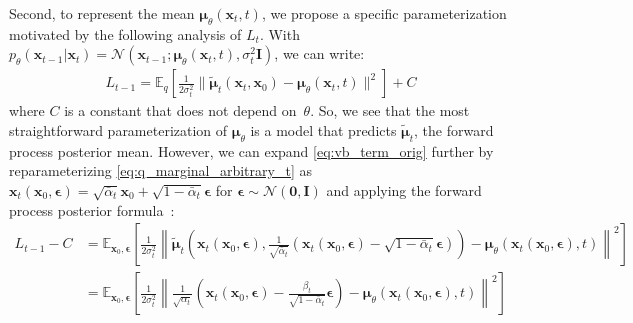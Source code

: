 \documentclass{article}
\newcommand{\E}{\mathbb{E}}
\newcommand{\Eb}[2]{\E_{#1}\!\left[#2\right]}
\newcommand{\bI}{\mathbf{I}}
\newcommand{\bzero}{\mathbf{0}}
\newcommand{\bx}{\mathbf{x}}
\newcommand{\bepsilon}{{\boldsymbol{\epsilon}}}
\newcommand{\bmu}{{\boldsymbol{\mu}}}
\begin{document}
Second, to represent the mean $\bmu_\theta(\bx_t, t)$, we propose a specific parameterization motivated by the following analysis of $L_t$.
With $p_\theta(\bx_{t-1} | \bx_t) = \mathcal{N}(\bx_{t-1}; \bmu_\theta(\bx_t, t), \sigma_t^2\bI)$, we can write:
\begin{align}
  L_{t-1}
   = \Eb{q}{ \frac{1}{2\sigma_t^2} \|\tilde\bmu_t(\bx_t,\bx_0) - \bmu_\theta(\bx_t, t)\|^2 } + C \label{eq:vb_term_orig}
\end{align}
where $C$ is a constant that does not depend on~$\theta$. So, we see that the most straightforward parameterization of $\bmu_\theta$ is a model that predicts $\tilde\bmu_t$, the forward process posterior mean.
However, we can expand \cref{eq:vb_term_orig} further by reparameterizing \cref{eq:q_marginal_arbitrary_t} as $\bx_t(\bx_0, \bepsilon) = \sqrt{\bar\alpha_t}\bx_0 + \sqrt{1-\bar\alpha_t}\bepsilon$ for $\bepsilon \sim \mathcal{N}(\bzero, \bI)$ and applying the forward process posterior formula~:
\begin{align}
  L_{t-1} - C &= \Eb{\bx_0, \bepsilon}{ \frac{1}{2\sigma_t^2} \left\| \tilde\bmu_t\!\left(\bx_t(\bx_0, \bepsilon), \frac{1}{\sqrt{\bar\alpha_t}} (\bx_t(\bx_0, \bepsilon) - \sqrt{1-\bar\alpha_t}\bepsilon) \right) - \bmu_\theta(\bx_t(\bx_0, \bepsilon), t) \right\|^2 } \\
  &=\Eb{\bx_0, \bepsilon}{ \frac{1}{2\sigma_t^2} \left\| \frac{1}{\sqrt{\alpha_t}}\left( \bx_t(\bx_0,\bepsilon) - \frac{\beta_t}{\sqrt{1-\bar\alpha_t}}\bepsilon \right) - \bmu_\theta(\bx_t(\bx_0,\bepsilon), t) \right\|^2 } \label{eq:vb_term_langevin_mu}
\end{align}
\end{document}
